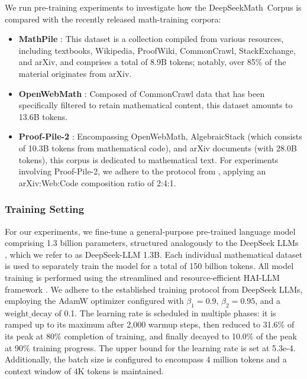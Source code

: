 \begin{itemize}[topsep=0pt]
We run pre-training experiments to investigate how the DeepSeekMath~Corpus is compared with the recently released math-training corpora:

\begin{itemize}[topsep=0pt]
    \item \textbf{MathPile} \citep{mathpile}: This dataset is a collection compiled from various resources, including textbooks, Wikipedia, ProofWiki, CommonCrawl, StackExchange, and arXiv, and comprises a total of 8.9B tokens; notably, over 85\% of the material originates from arXiv.
    \item \textbf{OpenWebMath} \citep{openwebmath}: Composed of CommonCrawl data that has been specifically filtered to retain mathematical content, this dataset amounts to 13.6B tokens.
    \item \textbf{Proof-Pile-2} \citep{llemma}: Encompassing OpenWebMath, AlgebraicStack (which consists of 10.3B tokens from mathematical code), and arXiv documents (with 28.0B tokens), this corpus is dedicated to mathematical text. For experiments involving Proof-Pile-2, we adhere to the protocol from \cite{llemma}, applying an arXiv:Web:Code composition ratio of 2:4:1.
\end{itemize}

\subsubsection{Training Setting}
\label{sec:quality-policy}
For our experiments, we fine-tune a general-purpose pre-trained language model comprising 1.3 billion parameters, structured analogously to the DeepSeek LLMs \citep{deepseek-llm}, which we refer to as DeepSeek-LLM 1.3B. Each individual mathematical dataset is used to separately train the model for a total of 150 billion tokens. All model training is performed using the streamlined and resource-efficient HAI-LLM framework \citep{haillm}. We adhere to the established training protocol from DeepSeek LLMs, employing the AdamW optimizer \citep{adamW} configured with $\beta_1=0.9$, $\beta_2=0.95$, and a $\mathrm{weight\_decay}$ of 0.1. The learning rate is scheduled in multiple phases: it is ramped up to its maximum after 2,000 warmup steps, then reduced to 31.6\% of its peak at 80\% completion of training, and finally decayed to 10.0\% of the peak at 90\% training progress. The upper bound for the learning rate is set at 5.3e-4. Additionally, the batch size is configured to encompass 4 million tokens and a context window of 4K tokens is maintained.


\end{itemize}
